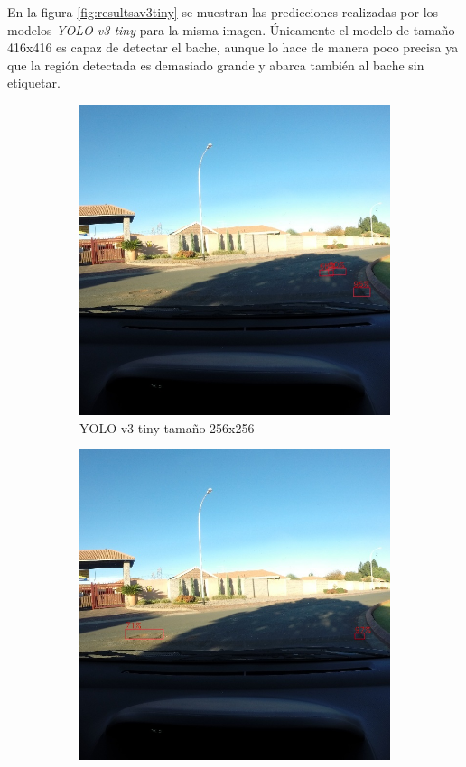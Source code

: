 En la figura \ref{fig:resultsav3tiny} se muestran las predicciones realizadas por los modelos \textit{YOLO v3 tiny} para la misma imagen. Únicamente el modelo de tamaño 416x416 es capaz de detectar el bache, aunque lo hace de manera poco precisa ya que la región detectada es demasiado grande y abarca también al bache sin etiquetar.

\begin{figure}[H]
	\centering
	\begin{subfigure}[h]{0.45\linewidth}
		\includegraphics[width=\linewidth]{images/results_a_yolo_v3_tiny_256.jpg}
		\caption{YOLO v3 tiny tamaño 256x256}
	\end{subfigure}
	\begin{subfigure}[h]{0.45\linewidth}
		\includegraphics[width=\linewidth]{images/results_a_yolo_v3_tiny_416.jpg}

\end{subfigure}
\end{figure}
